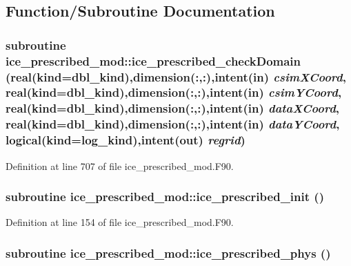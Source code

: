 \subsection{Function/Subroutine Documentation}
\hypertarget{namespaceice__prescribed__mod_acc7d1e7dfe5627bee722781e039280c9}{
\subsubsection[{ice\_\-prescribed\_\-checkDomain}]{\setlength{\rightskip}{0pt plus 5cm}subroutine ice\_\-prescribed\_\-mod::ice\_\-prescribed\_\-checkDomain (real(kind=dbl\_\-kind),dimension(:,:),intent(in) {\em csimXCoord}, \/  real(kind=dbl\_\-kind),dimension(:,:),intent(in) {\em csimYCoord}, \/  real(kind=dbl\_\-kind),dimension(:,:),intent(in) {\em dataXCoord}, \/  real(kind=dbl\_\-kind),dimension(:,:),intent(in) {\em dataYCoord}, \/  logical(kind=log\_\-kind),intent(out) {\em regrid})}}
\label{namespaceice__prescribed__mod_acc7d1e7dfe5627bee722781e039280c9}


Definition at line 707 of file ice\_\-prescribed\_\-mod.F90.\hypertarget{namespaceice__prescribed__mod_a653502aece9eed08846385d30fec703b}{
\subsubsection[{ice\_\-prescribed\_\-init}]{\setlength{\rightskip}{0pt plus 5cm}subroutine ice\_\-prescribed\_\-mod::ice\_\-prescribed\_\-init ()}}
\label{namespaceice__prescribed__mod_a653502aece9eed08846385d30fec703b}


Definition at line 154 of file ice\_\-prescribed\_\-mod.F90.\hypertarget{namespaceice__prescribed__mod_a9e6ac38b742040541c97492d74282b7a}{
\subsubsection[{ice\_\-prescribed\_\-phys}]{\setlength{\rightskip}{0pt plus 5cm}subroutine ice\_\-prescribed\_\-mod::ice\_\-prescribed\_\-phys ()}}
\label{namespaceice__prescribed__mod_a9e6ac38b742040541c97492d74282b7a}


